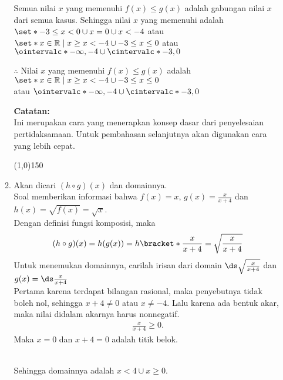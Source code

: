 \begin{enumerate}[leftmargin=*, label={\arabic*}.]
\begin{enumerate}[label={\alph*}.]
Semua nilai $x$ yang memenuhi $f(x) \leq g(x)$ adalah gabungan nilai $x$ 
dari semua kasus. Sehingga nilai $x$ yang memenuhi adalah 
$\set*{-3 \leq x < 0 \cup x = 0 \cup x < -4}$ atau 
$\set*{x \in \mathbb{R} \mid x \geq x < -4 \cup -3 \leq x \leq 0}$
atau $\ointervalc*{-\infty, -4} \cup \cintervalc*{-3,0}$
    
$\therefore$ Nilai $x$ yang memenuhi $f(x) \leq g(x)$ adalah
$\set*{x \in \mathbb{R} \mid x \geq x < -4 \cup -3 \leq x \leq 0}$\\
atau $\ointervalc*{-\infty, -4} \cup \cintervalc*{-3,0}$
    
\vspace{0.1cm}
\textbf{Catatan:}\\
Ini merupakan cara yang menerapkan konsep dasar dari penyelesaian
pertidaksamaan. Untuk pembahasan selanjutnya akan digunakan cara yang 
lebih cepat.
\begin{center}
    \line(1,0){150}
\end{center}
\item Akan dicari $(h \circ g)(x)$ dan domainnya.\\
Soal memberikan informasi bahwa $f(x) = x$, $g(x) = \frac{x}{x+4}$ 
dan $h(x) = \sqrt{f(x)} = \sqrt{x}$.\\
Dengan definisi fungsi komposisi, maka
\[
    (h \circ g)(x) = h(g(x)) = h\bracket*{\frac{x}{x+4}} 
    = \sqrt{\frac{x}{x+4}}
\]
Untuk menemukan domainnya, carilah irisan dari domain  
$\ds \sqrt{\frac{x}{x+4}}$ dan $g(x)=\ds\frac{x}{x+4}$\\
Pertama karena terdapat bilangan rasional, maka penyebutnya tidak boleh
nol, sehingga $x+4 \neq 0$ atau $x\neq-4$. Lalu karena ada bentuk akar, 
maka nilai didalam akarnya harus nonnegatif.
\begin{align*}
    \frac{x}{x+4} \geq 0.
\end{align*}
Maka $x=0$ dan $x+4=0$ adalah titik belok.

\vspace{0.2cm}
\\
Sehingga domainnya adalah $x < 4 \cup x \geq 0$.


\end{enumerate}
\end{enumerate}

